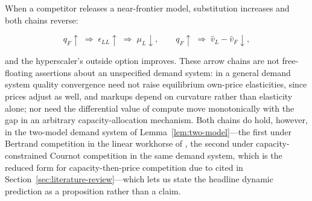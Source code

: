 \documentclass[11pt]{article}
\begin{document}
When a competitor releases a near-frontier model, substitution increases and both chains reverse:

\begin{equation}q_F\uparrow\;\Longrightarrow\;\epsilon_{LL}\uparrow\;\Longrightarrow\;\mu_L\downarrow,\qquad q_F\uparrow\;\Longrightarrow\;\widehat v_L-\widehat v_F\downarrow,\end{equation}

and the hyperscaler's outside option improves. These arrow chains are not free-floating assertions about an unspecified demand system: in a general demand system quality convergence need not raise equilibrium own-price elasticities, since prices adjust as well, and markups depend on curvature rather than elasticity alone; nor need the differential value of compute move monotonically with the gap in an arbitrary capacity-allocation mechanism. Both chains do hold, however, in the two-model demand system of Lemma~\ref{lem:two-model}---the first under Bertrand competition in the linear workhorse of \citet{singhVives1984}, the second under capacity-constrained Cournot competition in the same demand system, which is the reduced form for capacity-then-price competition due to \citet{krepsScheinkman1983} cited in Section~\ref{sec:literature-review}---which lets us state the headline dynamic prediction as a proposition rather than a claim.
\end{document}
